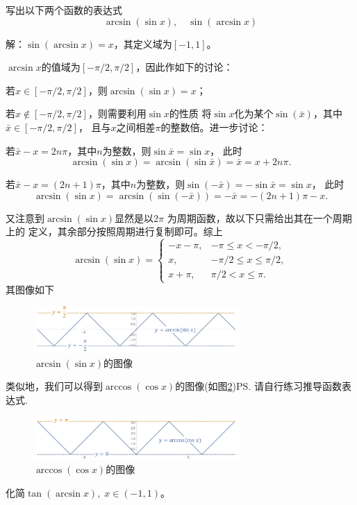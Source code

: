 \bs
\egz 写出以下两个函数的表达式
$$\arcsin(\sin x),\quad \sin(\arcsin x)$$

解：$\sin(\arcsin x)=x$，其定义域为$[-1,1]$。

$\arcsin x$的值域为$[-\pi/2,\pi/2]$，因此作如下的讨论：

若$x\in[-\pi/2,\pi/2]$，则$\arcsin(\sin x)=x$；

若$x\notin[-\pi/2,\pi/2]$，则需要利用$\sin x$的性质
将$\sin x$化为某个$\sin(\bar x)$，其中$\bar x\in[-\pi/2,\pi/2]$，
且与$x$之间相差$\pi$的整数倍。进一步讨论：

若$\bar x-x=2n\pi$，其中$n$为整数，则$\sin\bar x=\sin x$，
此时
$$\arcsin(\sin x)=\arcsin(\sin\bar x)=\bar x=x+2n\pi.$$

若$\bar x-x=(2n+1)\pi$，其中$n$为整数，则$\sin(-\bar x)
=-\sin\bar x=\sin x$，
此时
$$\arcsin(\sin x)=\arcsin(\sin(-\bar x))=-\bar x=-(2n+1)\pi-x.$$

又注意到$\arcsin(\sin x)$显然是以$2\pi$
为周期函数，故以下只需给出其在一个周期上的
定义，其余部分按照周期进行复制即可。综上
$$\arcsin(\sin x)=\left\{\begin{array}{ll}
-x-\pi, & -\pi\leq x<-\pi/2,\\
x, & -\pi/2\leq x\leq\pi/2,\\ 
x+\pi, & \pi/2<x\leq\pi.
\end{array}\right.$$
其图像如下
\begin{figure}[h]
	\centering
	\includegraphics[width=0.7\textwidth]{./Images/Ch01/arcsin-sin.pdf}
	\caption{$\arcsin(\sin x)$的图像}
	\label{fig:arcsin-sin}
\end{figure}

类似地，我们可以得到$\arccos(\cos x)$的图像(如图\ref{fig:arccos-cos})\ps{请自行练习推导函数表达式}.
\begin{figure}[h]
	\centering
	\includegraphics[width=0.7\textwidth]{./Images/Ch01/arccos-cos.pdf}
	\caption{$\arccos(\cos x)$的图像}
	\label{fig:arccos-cos}
\end{figure}
\fin

\egz 化简$\tan(\arcsin x),\;x\in(-1,1)$。

